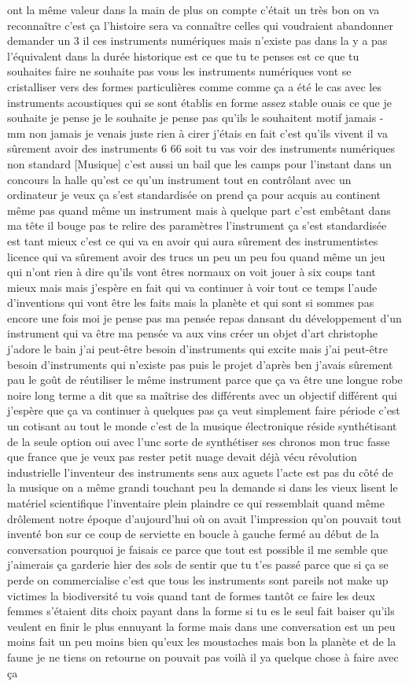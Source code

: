 ont la même valeur dans la main de plus on compte c'était un très bon on va reconnaître c'est ça l'histoire sera va connaître celles qui voudraient abandonner demander un 3 il ces instruments numériques mais n'existe pas dans la y a pas l'équivalent dans la durée historique est ce que tu te penses est ce que tu souhaites faire ne souhaite pas vous les instruments numériques vont se cristalliser vers des formes particulières comme comme ça a été le cas avec les instruments acoustiques qui se sont établis en forme assez stable ouais ce que je souhaite je pense je le souhaite je pense pas qu'ils le souhaitent motif jamais - mm non jamais je venais juste rien à cirer j'étais en fait c'est qu'ils vivent il va sûrement avoir des instruments 6 66 soit tu vas voir des instruments numériques non standard [Musique] c'est aussi un bail que les camps pour l'instant dans un concours la halle qu'est ce qu'un instrument tout en contrôlant avec un ordinateur je veux ça s'est standardisée on prend ça pour acquis au continent même pas quand même un instrument mais à quelque part c'est embêtant dans ma tête il bouge pas te relire des paramètres l'instrument ça s'est standardisée est tant mieux c'est ce qui va en avoir qui aura sûrement des instrumentistes licence qui va sûrement avoir des trucs un peu un peu fou quand même un jeu qui n'ont rien à dire qu'ils vont êtres normaux on voit jouer à six coups tant mieux mais mais j'espère en fait qui va continuer à voir tout ce temps l'aude d'inventions qui vont être les faits mais la planète et qui sont si sommes pas encore une fois moi je pense pas ma pensée repas dansant du développement d'un instrument qui va être ma pensée va aux vins créer un objet d'art christophe j'adore le bain j'ai peut-être besoin d'instruments qui excite mais j'ai peut-être besoin d'instruments qui n'existe pas puis le projet d'après ben j'avais sûrement pau le goût de réutiliser le même instrument parce que ça va être une longue robe noire long terme a dit que sa maîtrise des différents avec un objectif différent qui j'espère que ça va continuer à quelques pas ça veut simplement faire période c'est un cotisant au tout le monde c'est de la musique électronique réside synthétisant de la seule option oui avec l'unc sorte de synthétiser ses chronos mon truc fasse que france que je veux pas rester petit nuage devait déjà vécu révolution industrielle l'inventeur des instruments sens aux aguets l'acte est pas du côté de la musique on a même grandi touchant peu la demande si dans les vieux lisent le matériel scientifique l'inventaire plein plaindre ce qui ressemblait quand même drôlement notre époque d'aujourd'hui où on avait l'impression qu'on pouvait tout inventé bon sur ce coup de serviette en boucle à gauche fermé au début de la conversation pourquoi je faisais ce parce que tout est possible il me semble que j'aimerais ça garderie hier des sols de sentir que tu t'es passé parce que si ça se perde on commercialise c'est que tous les instruments sont pareils not make up victimes la biodiversité tu vois quand tant de formes tantôt ce faire les deux femmes s'étaient dits choix payant dans la forme si tu es le seul fait baiser qu'ils veulent en finir le plus ennuyant la forme mais dans une conversation est un peu moins fait un peu moins bien qu'eux les moustaches mais bon la planète et de la faune je ne tiens on retourne on pouvait pas voilà il ya quelque chose à faire avec ça

